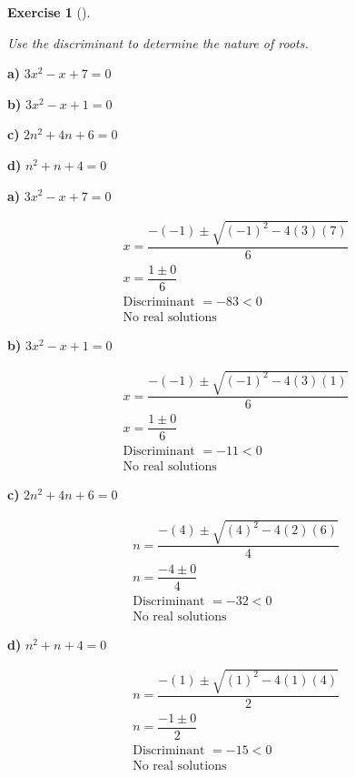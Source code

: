 \documentclass[
  letterpaper,
  DIV=11,
  numbers=noendperiod]{scrreprt}
\theoremstyle{definition}
\newtheorem{exercise}{Exercise}[chapter]
\theoremstyle{remark}
\begin{document}
\begin{exercise}[]\protect\hypertarget{exr-u6-13}{}\label{exr-u6-13}

\emph{Use the discriminant to determine the nature of roots.}

\textbf{a)} \(\displaystyle 3x^2 - x + 7 = 0\)

\textbf{b)} \(\displaystyle 3x^2 - x + 1 = 0\)

\textbf{c)} \(\displaystyle 2n^2 + 4n + 6 = 0\)

\textbf{d)} \(\displaystyle n^2 + n + 4 = 0\)

\begin{tcolorbox}[enhanced jigsaw, opacitybacktitle=0.6, coltitle=black, arc=.35mm, colframe=quarto-callout-tip-color-frame, colback=white, bottomrule=.15mm, left=2mm, colbacktitle=quarto-callout-tip-color!10!white, titlerule=0mm, opacityback=0, title=\textcolor{quarto-callout-tip-color}{\faLightbulb}\hspace{0.5em}{🔍 View Solutions}, leftrule=.75mm, breakable, rightrule=.15mm, bottomtitle=1mm, toptitle=1mm, toprule=.15mm]

\textbf{a)} \(\displaystyle 3x^2 - x + 7 = 0\)

\begin{align*}
x = \dfrac{-(-1) \pm \sqrt{(-1)^2 - 4(3)(7)}}{6} \\ x = \dfrac{1 \pm 0}{6} \\ \text{Discriminant } = -83 < 0 \\ \text{No real solutions}
\end{align*}

\textbf{b)} \(\displaystyle 3x^2 - x + 1 = 0\)

\begin{align*}
x = \dfrac{-(-1) \pm \sqrt{(-1)^2 - 4(3)(1)}}{6} \\ x = \dfrac{1 \pm 0}{6} \\ \text{Discriminant } = -11 < 0 \\ \text{No real solutions}
\end{align*}

\textbf{c)} \(\displaystyle 2n^2 + 4n + 6 = 0\)

\begin{align*}
n = \dfrac{-(4) \pm \sqrt{(4)^2 - 4(2)(6)}}{4} \\ n = \dfrac{-4 \pm 0}{4} \\ \text{Discriminant } = -32 < 0 \\ \text{No real solutions}
\end{align*}

\textbf{d)} \(\displaystyle n^2 + n + 4 = 0\)

\begin{align*}
n = \dfrac{-(1) \pm \sqrt{(1)^2 - 4(1)(4)}}{2} \\ n = \dfrac{-1 \pm 0}{2} \\ \text{Discriminant } = -15 < 0 \\ \text{No real solutions}
\end{align*}

\end{tcolorbox}

\end{exercise}
\end{document}
